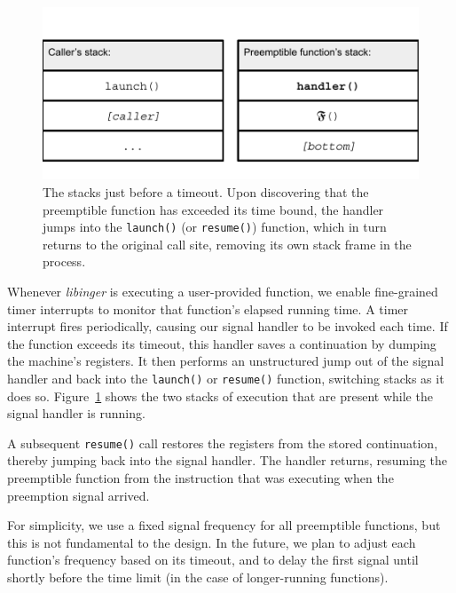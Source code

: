 \begin{figure}
\includegraphics[width=\columnwidth]{figs/twostacks}
\caption{The stacks just before a timeout.  \textnormal{Upon discovering
that the preemptible function has exceeded its time bound, the handler jumps into the
\texttt{launch()} (or \texttt{resume()}) function, which in turn returns to the
original call site, removing its own stack frame in the process.}}
\label{fig:twostacks}
\end{figure}

Whenever \textit{libinger} is executing a user-provided function, we
enable fine-grained timer interrupts to
monitor that function's elapsed running time.  A timer interrupt fires
periodically, causing our signal
handler to be invoked each time.  If the function exceeds its timeout,
this handler saves a continuation by dumping the machine's registers.  It then
performs an unstructured jump out of the signal handler and back into the
\texttt{launch()} or \texttt{resume()} function, switching stacks as it does so.
Figure~\ref{fig:twostacks} shows the two stacks of execution
that are present while the
signal handler is running.

A subsequent \texttt{resume()} call restores the registers from the stored
continuation, thereby jumping back into the signal handler.  The handler
returns, resuming the preemptible function from the instruction that was executing
when the preemption signal arrived.

For simplicity, we use a fixed signal frequency for all preemptible
functions, but this is not fundamental to the design.  In the future, we plan to
adjust each function's frequency based on its timeout, and to delay the first signal
until
shortly before the time limit (in the case of longer-running functions).


